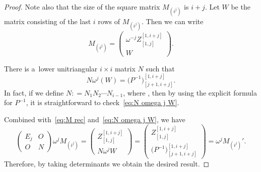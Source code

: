 \documentclass[pdftex]{sigma}
\numberwithin{equation}{section}
\theoremstyle{definition}
\begin{document}
\begin{proof}
Note also that the size of the square matrix $M_{(i^j)}$ is $i+j$.
Let $W$ be the matrix consisting of the last $i$ rows of $M_{(i^j)}$.
Then we can write \begin{equation}
M_{(i^j)}=\left(
\begin{matrix}
\omega^{-j}Z_{[1,j]}^{[1,i+j]}\\\hline
W
\end{matrix}
\right).\label{eq:M rec}
\end{equation}


There is a~lower unitriangular $i\times i$ matrix $N$
such that
\begin{equation}
N \omega^j(W)
=\bigl(P^{-1}\bigr)_{[j+1,i+j]}^{[1,i+j]}.
\label{eq:N omega j W}
\end{equation}
In fact, if we define
$
N:
=
N_1
N_2
\cdots
N_{i-1}$,
where
, then by using the explicit formula for $P^{-1}$, it is straightforward to check~\eqref{eq:N omega j W}.




Combined with~\eqref{eq:M rec} and~\eqref{eq:N omega j W}, we have
\[
\begin{pmatrix}
E_j & O\\
O & N
\end{pmatrix}\omega^j M_{(i^j)}=\left(
\begin{matrix}
Z_{[1,j]}^{[1,i+j]}\\\hline
N\omega^j W
\end{matrix}
\right)=\left(
\begin{matrix}
Z_{[1,j]}^{[1,i+j]}\\\hline
\bigl(P^{-1}\bigr)_{[j+1,i+j]}^{[1,i+j]}
\end{matrix}
\right)=\omega^j M_{(i^j)}'.
\]
Therefore, by taking determinants we
obtain the desired result.
\end{proof}
\end{document}
